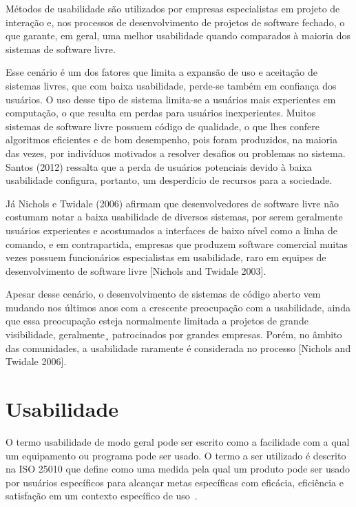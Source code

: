 \documentclass[12pt]{article}
\begin{document}
Métodos de usabilidade são utilizados por empresas especialistas em projeto de interação e, nos processos de desenvolvimento de projetos de software fechado, o que garante, em geral, uma melhor usabilidade quando comparados à maioria dos sistemas de software livre.
%

Esse cenário é um dos fatores que limita a expansão de uso e aceitação de sistemas livres, que com baixa usabilidade, perde-se também em confiança dos usuários. O uso desse tipo de sistema limita-se a usuários mais experientes em computação, o que resulta em perdas para usuários inexperientes. Muitos sistemas de software livre possuem código de qualidade, o que lhes confere algoritmos eficientes e de bom desempenho, pois foram produzidos, na maioria das vezes, por indivíduos motivados a resolver desafios ou problemas no sistema. Santos (2012) ressalta que a perda de usuários potenciais devido à baixa usabilidade configura, portanto, um desperdício de recursos para a sociedade.

%
Já Nichols e Twidale (2006) afirmam que desenvolvedores de software livre não costumam notar a baixa usabilidade de diversos sistemas, por serem geralmente usuários experientes e acostumados a interfaces de baixo nível como a linha de comando, e em contrapartida, empresas que produzem software comercial muitas vezes possuem funcionários especialistas em usabilidade, raro em equipes de desenvolvimento de software livre [Nichols and Twidale 2003].
%

Apesar desse cenário, o desenvolvimento de sistemas de código aberto vem mudando nos últimos anos com a crescente preocupação com a usabilidade, ainda que essa preocupação esteja normalmente limitada a projetos de grande visibilidade, geralmente¸ patrocinados por grandes empresas. Porém, no âmbito das comunidades, a usabilidade raramente é considerada no processo [Nichols and Twidale 2006].

\section{Usabilidade}
\label{sec:usabilidade}
O termo usabilidade de modo geral pode ser escrito como a facilidade com a qual um equipamento ou programa pode ser usado. O termo a ser utilizado é descrito na ISO 25010 que define como uma medida pela qual um produto pode ser usado por usuários específicos para alcançar metas específicas com eficácia, eficiência e satisfação em um contexto específico de uso~\cite{}.
\end{document}
